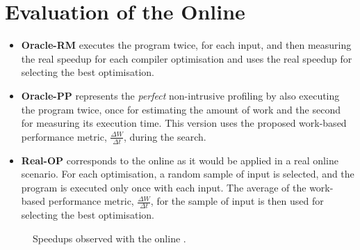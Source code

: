 \section{Evaluation of the Online {\IterComp}}

\begin{itemize}
\item \textbf{Oracle-RM} executes the program twice, for each input, and then measuring the real speedup for each compiler optimisation and uses the real speedup for selecting the best optimisation.
\item \textbf{Oracle-PP} represents the \textit{perfect} non-intrusive profiling by also executing the program twice, once for estimating the amount of work and the second for measuring its execution time.
This version uses the proposed work-based performance metric, $\frac{\Delta W}{\Delta t}$, during the {\itercomp} search.
\item \textbf{Real-OP} corresponds to the online {\itercomp} as it would be applied in a real online scenario.
      For each optimisation, a random sample of input is selected, and the program is executed only once with each input.
      The average of the work-based performance metric, $\frac{\Delta W}{\Delta t}$, for the sample of input is then used for selecting the best optimisation.
\end{itemize}

\begin{figure}[htb]
    \centering
    \caption{Speedups observed with the online {\itercomp}.}
    \label{fig:speedups}
\end{figure}

